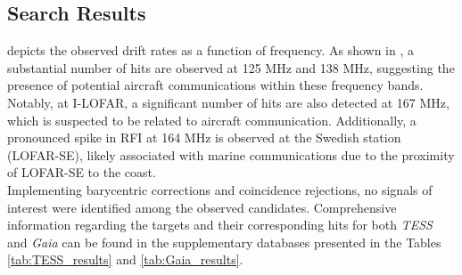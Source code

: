 \subsection{Search Results}

 depicts the observed drift rates as a function of frequency. As shown in , a substantial number of hits are observed at 125 MHz and 138 MHz, suggesting the presence of potential aircraft communications within these frequency bands. Notably, at I-LOFAR, a significant number of hits are also detected at 167 MHz, which is suspected to be related to aircraft communication. Additionally, a pronounced spike in RFI at 164 MHz is observed at the Swedish station (LOFAR-SE), likely associated with marine communications due to the proximity of LOFAR-SE to the coast. \\ 

Implementing barycentric corrections and coincidence rejections, no signals of interest were identified among the observed candidates. Comprehensive information regarding the targets and their corresponding hits for both \textit{TESS} and \textit{Gaia} can be found in the supplementary databases presented in the Tables \ref{tab:TESS_results} and \ref{tab:Gaia_results}.


